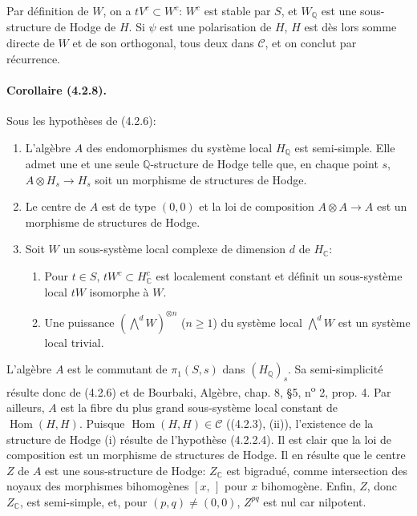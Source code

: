 \documentclass[10pt]{article}
\newcommand{\C}{\mathbb C}
\newcommand{\Q}{\mathbb Q}
\newcommand{\Hom}{\operatorname{Hom}}
\begin{document}
Par définition de $W$, on a $tV^c\subset W^c$: $W^c$ est stable par $S$, et $W_\Q$ est une sous-structure de Hodge de $H$. Si $\psi$ est une polarisation de $H$, $H$ est dès lors somme directe de $W$ et de son orthogonal, tous deux dans $\mathcal C$, et on conclut par récurrence.

\paragraph{Corollaire (4.2.8).} Sous les hypothèses de (4.2.6):
\begin{enumerate}[label=(\roman*)]
\item L'algèbre $A$ des endomorphismes du système local $H_\Q$ est semi-simple. Elle admet une et une seule $\Q$-structure de Hodge telle que, en chaque point $s$, $A\otimes H_s\to H_s$ soit un morphisme de structures de Hodge.
\item Le centre de $A$ est de type $(0,0)$ et la loi de composition $A\otimes A\to A$ est un morphisme de structures de Hodge.
\item Soit $W$ un sous-système local complexe de dimension $d$ de $H_\C$:
\begin{enumerate}[label=\alph*)]
\item Pour $t\in S$, $tW^c\subset H_\C^c$ est localement constant et définit un sous-système local $tW$ isomorphe à $W$.
\item Une puissance $(\bigwedge^dW)^{\otimes n}$ ($n\ge1$) du système local $\bigwedge^dW$ est un système local trivial.
\end{enumerate}
\end{enumerate}

L'algèbre $A$ est le commutant de $\pi_1(S,s)$ dans $(H_\Q)_s$. Sa semi-simplicité résulte donc de (4.2.6) et de Bourbaki, Algèbre, chap. 8, §5, n\textsuperscript{o} 2, prop. 4. Par ailleurs, $A$ est la fibre du plus grand sous-système local constant de $\Hom(H,H)$. Puisque $\Hom(H,H)\in\mathcal C$ ((4.2.3), (ii)), l'existence de la structure de Hodge (i) résulte de l'hypothèse (4.2.2.4). Il est clair que la loi de composition est un morphisme de structures de Hodge. Il en résulte que le centre $Z$ de $A$ est une sous-structure de Hodge: $Z_\C$ est bigradué, comme intersection des noyaux des morphismes bihomogènes $[x,\,]$ pour $x$ bihomogène. Enfin, $Z$, donc $Z_\C$, est semi-simple, et, pour $(p,q)\ne(0,0)$, $Z^{pq}$ est nul car nilpotent.
\end{document}
